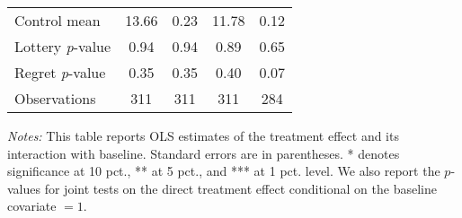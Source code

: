 \begin{table}[htbp]
{\begin{threeparttable}
\begin{tabular}{l*{4}{c}}
Control mean    &    13.66         &     0.23         &    11.78         &     0.12         \\
Lottery \emph{p}-value&     0.94         &     0.94         &     0.89         &     0.65         \\
Regret \emph{p}-value&     0.35         &     0.35         &     0.40         &     0.07         \\
Observations    &      311         &      311         &      311         &      284         \\
\bottomrule \end{tabular} \begin{tablenotes}[flushleft] \footnotesize \item \emph{Notes:} This table reports OLS estimates of the treatment effect and its interaction with baseline. Standard errors are in parentheses. * denotes significance at 10 pct., ** at 5 pct., and *** at 1 pct. level. We also report the \(p\)-values for joint tests on the direct treatment effect conditional on the baseline covariate $= 1$. \end{tablenotes} \end{threeparttable} } \end{table}

